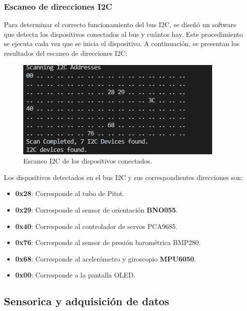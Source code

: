 \subsubsection{Escaneo de direcciones I2C} 
Para determinar el correcto funcionamiento del bus I2C, se diseñó un software que detecta los dispositivos conectados al bus y cuántos hay. Este procedimiento se ejecuta cada vez que se inicia el dispositivo. A continuación, se presentan los resultados del escaneo de direcciones I2C:\\ 
\begin{figure}[H]
    \centering
    \includegraphics[width=10 cm]{Imagenes/Metodologia/I2C_scan.png}
    \caption{Escaneo I2C de los dispositivos conectados.}
    \label{fig:i2c_scan}
\end{figure}
Los dispositivos detectados en el bus I2C y sus correspondientes direcciones son:\\ 
\begin{itemize}
    \item \textbf{0x28}: Corresponde al tubo de Pitot.
    \item \textbf{0x29}: Corresponde al sensor de orientación \textbf{BNO055}.
    \item \textbf{0x40}: Corresponde al controlador de servos PCA9685.
    \item \textbf{0x76}: Corresponde al sensor de presión barométrica BMP280.
    \item \textbf{0x68}: Corresponde al acelerómetro y giroscopio \textbf{MPU6050}.
    \item \textbf{0x00}: Corresponde a la pantalla OLED.
\end{itemize}

\subsection{Sensorica y adquisición de datos} 

